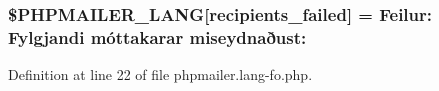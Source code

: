 \subsubsection[{\texorpdfstring{\$\+P\+H\+P\+M\+A\+I\+L\+E\+R\+\_\+\+L\+A\+NG}{$PHPMAILER_LANG}}]{\setlength{\rightskip}{0pt plus 5cm}\$P\+H\+P\+M\+A\+I\+L\+E\+R\+\_\+\+L\+A\+NG\mbox{[}\textquotesingle{}recipients\+\_\+failed\textquotesingle{}\mbox{]} =  Feilur\+: Fylgjandi móttakarar miseydnaðust\+: \textquotesingle{}}\hypertarget{phpmailer_8lang-fo_8php_a7589d30bb9b368327c2df015f3e6bcba}{}\label{phpmailer_8lang-fo_8php_a7589d30bb9b368327c2df015f3e6bcba}


Definition at line 22 of file phpmailer.\+lang-\/fo.\+php.


